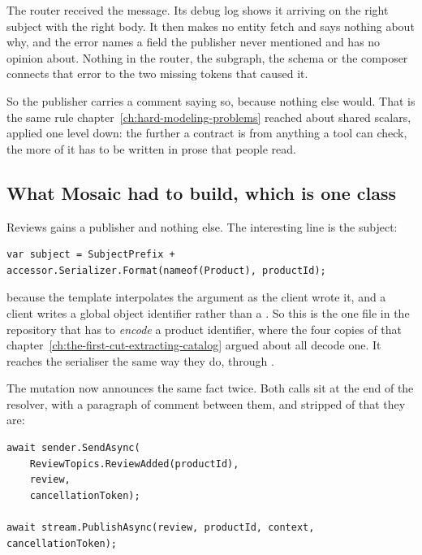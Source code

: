 The router received the message. Its debug log shows it arriving on the right
subject with the right body. It then makes no entity fetch and says nothing
about why, and the error names a field the publisher never mentioned and has no
opinion about. Nothing in the router, the subgraph, the schema or the composer
connects that error to the two missing tokens that caused it.

So the publisher carries a comment saying so, because nothing else would. That
is the same rule chapter~\ref{ch:hard-modeling-problems} reached about shared
scalars, applied one level down: the further a contract is from anything a tool
can check, the more of it has to be written in prose that people read.

\subsection*{What Mosaic had to build, which is one class}

%
Reviews gains a publisher and nothing else. The interesting line is the
subject:

\begin{verbatim}
var subject = SubjectPrefix + accessor.Serializer.Format(nameof(Product), productId);
\end{verbatim}

%
because the template interpolates the argument as the client wrote it, and a
client writes a global object identifier rather than a . So this is
the one file in the repository that has to \emph{encode} a product identifier,
where the four copies of  that
chapter~\ref{ch:the-first-cut-extracting-catalog} argued about all decode one.
It reaches the serialiser the same way they do, through
.

The mutation now announces the same fact twice. Both calls sit at the end of
the resolver, with a paragraph of comment between them, and stripped of that
they are:

\begin{verbatim}
await sender.SendAsync(
    ReviewTopics.ReviewAdded(productId),
    review,
    cancellationToken);

await stream.PublishAsync(review, productId, context, cancellationToken);
\end{verbatim}

